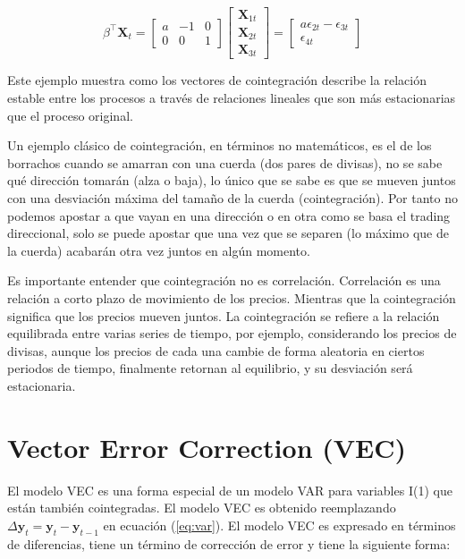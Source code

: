 \[
\beta^\intercal \mathbf{X}_t = 
\begin{bmatrix}
a & -1 & 0 \\
0 & 0 & 1
\end{bmatrix} 
\begin{bmatrix} 
\mathbf{X}_{1t} \\
\mathbf{X}_{2t} \\
\mathbf{X}_{3t}
\end{bmatrix} = 
\begin{bmatrix}
a\epsilon_{2t} - \epsilon_{3t} \\
\epsilon_{4t}
\end{bmatrix}
\]

Este ejemplo muestra como los vectores de cointegración describe la relación
estable entre los procesos a través de relaciones lineales que son más
estacionarias que el proceso original.

Un ejemplo clásico de cointegración, en términos no matemáticos, es el de los
borrachos cuando se amarran con una cuerda (dos pares de divisas), no se sabe
qué  dirección tomarán (alza o baja), lo único que se sabe es que se mueven
juntos con una desviación máxima del tamaño de la cuerda (cointegración).  Por
tanto no podemos apostar a que vayan en una dirección o en otra como se basa el
trading direccional, solo se puede apostar que una vez que se separen (lo
máximo que de la cuerda) acabarán otra vez juntos en algún momento.

Es importante entender que cointegración no es correlación. Correlación es una
relación a corto plazo de movimiento de los precios. Mientras que la
cointegración significa que los precios mueven juntos. La cointegración se
refiere a la relación equilibrada entre varias series de tiempo, por ejemplo,
considerando los precios de divisas, aunque los precios de cada una cambie de
forma aleatoria en ciertos periodos de tiempo, finalmente retornan al
equilibrio, y su desviación será estacionaria.

\section{Vector Error Correction (VEC)}

El modelo VEC es una forma especial de un modelo VAR para variables I(1) que
están también cointegradas. El modelo VEC es obtenido reemplazando
$\Delta \mathbf{y}_t = \mathbf{y}_t - \mathbf{y}_{t-1}$ en ecuación
(\ref{eq:var}). El modelo VEC es expresado en términos de diferencias,
tiene un término de corrección de error y tiene la siguiente forma:

